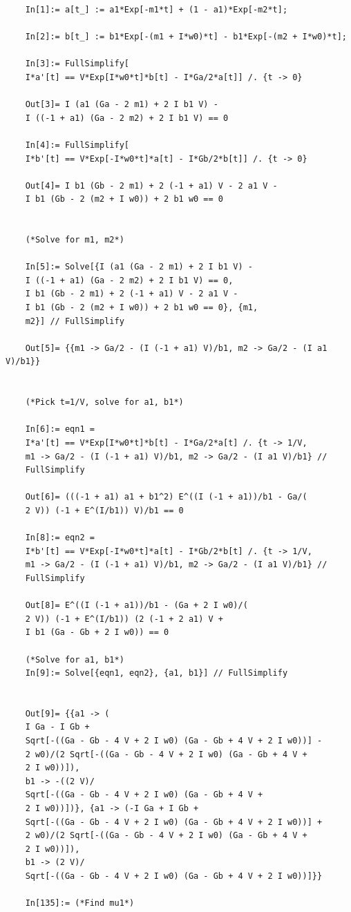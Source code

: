 \documentclass{article}
\theoremstyle{definition}
\begin{document}
\begin{enumerate}[label=(\alph*)]
\begin{lstlisting}
	In[1]:= a[t_] := a1*Exp[-m1*t] + (1 - a1)*Exp[-m2*t];
	
	In[2]:= b[t_] := b1*Exp[-(m1 + I*w0)*t] - b1*Exp[-(m2 + I*w0)*t];
	
	In[3]:= FullSimplify[
	I*a'[t] == V*Exp[I*w0*t]*b[t] - I*Ga/2*a[t]] /. {t -> 0}
	
	Out[3]= I (a1 (Ga - 2 m1) + 2 I b1 V) - 
	I ((-1 + a1) (Ga - 2 m2) + 2 I b1 V) == 0
	
	In[4]:= FullSimplify[
	I*b'[t] == V*Exp[-I*w0*t]*a[t] - I*Gb/2*b[t]] /. {t -> 0}
	
	Out[4]= I b1 (Gb - 2 m1) + 2 (-1 + a1) V - 2 a1 V - 
	I b1 (Gb - 2 (m2 + I w0)) + 2 b1 w0 == 0
	
	
	(*Solve for m1, m2*)
	
	In[5]:= Solve[{I (a1 (Ga - 2 m1) + 2 I b1 V) - 
	I ((-1 + a1) (Ga - 2 m2) + 2 I b1 V) == 0, 
	I b1 (Gb - 2 m1) + 2 (-1 + a1) V - 2 a1 V - 
	I b1 (Gb - 2 (m2 + I w0)) + 2 b1 w0 == 0}, {m1, 
	m2}] // FullSimplify
	
	Out[5]= {{m1 -> Ga/2 - (I (-1 + a1) V)/b1, m2 -> Ga/2 - (I a1 V)/b1}}
	
	
	(*Pick t=1/V, solve for a1, b1*)
	
	In[6]:= eqn1 = 
	I*a'[t] == V*Exp[I*w0*t]*b[t] - I*Ga/2*a[t] /. {t -> 1/V, 
	m1 -> Ga/2 - (I (-1 + a1) V)/b1, m2 -> Ga/2 - (I a1 V)/b1} // 
	FullSimplify
	
	Out[6]= (((-1 + a1) a1 + b1^2) E^((I (-1 + a1))/b1 - Ga/(
	2 V)) (-1 + E^(I/b1)) V)/b1 == 0
	
	In[8]:= eqn2 = 
	I*b'[t] == V*Exp[-I*w0*t]*a[t] - I*Gb/2*b[t] /. {t -> 1/V, 
	m1 -> Ga/2 - (I (-1 + a1) V)/b1, m2 -> Ga/2 - (I a1 V)/b1} // 
	FullSimplify
	
	Out[8]= E^((I (-1 + a1))/b1 - (Ga + 2 I w0)/(
	2 V)) (-1 + E^(I/b1)) (2 (-1 + 2 a1) V + 
	I b1 (Ga - Gb + 2 I w0)) == 0
	
	(*Solve for a1, b1*)
	In[9]:= Solve[{eqn1, eqn2}, {a1, b1}] // FullSimplify
	

	Out[9]= {{a1 -> (
	I Ga - I Gb + 
	Sqrt[-((Ga - Gb - 4 V + 2 I w0) (Ga - Gb + 4 V + 2 I w0))] - 
	2 w0)/(2 Sqrt[-((Ga - Gb - 4 V + 2 I w0) (Ga - Gb + 4 V + 
	2 I w0))]), 
	b1 -> -((2 V)/
	Sqrt[-((Ga - Gb - 4 V + 2 I w0) (Ga - Gb + 4 V + 
	2 I w0))])}, {a1 -> (-I Ga + I Gb + 
	Sqrt[-((Ga - Gb - 4 V + 2 I w0) (Ga - Gb + 4 V + 2 I w0))] + 
	2 w0)/(2 Sqrt[-((Ga - Gb - 4 V + 2 I w0) (Ga - Gb + 4 V + 
	2 I w0))]), 
	b1 -> (2 V)/
	Sqrt[-((Ga - Gb - 4 V + 2 I w0) (Ga - Gb + 4 V + 2 I w0))]}}
	
	In[135]:= (*Find mu1*)
	

\end{lstlisting}
\end{enumerate}
\end{document}
